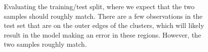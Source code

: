 \documentclass[
  letterpaper,
]{krantz}
\begin{document}
\begin{figure}

\begin{minipage}{0.50\linewidth}



\end{minipage}%
%
\begin{minipage}{0.50\linewidth}



\end{minipage}%

\caption{\label{fig-p-split-pdf}Evaluating the training/test split,
where we expect that the two samples should roughly match. There are a
few observations in the test set that are on the outer edges of the
clusters, which will likely result in the model making an error in these
regions. However, the two samples roughly match.}

\end{figure}%
\end{document}
